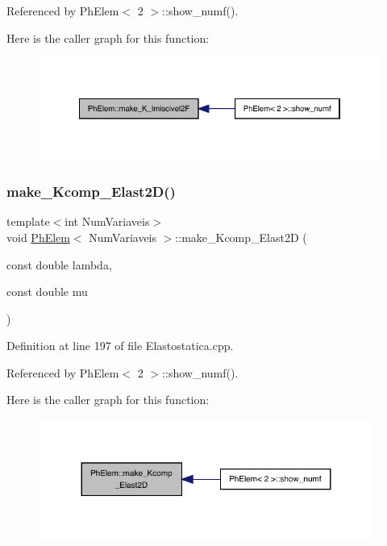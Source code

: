 Referenced by Ph\+Elem$<$ 2 $>$\+::show\+\_\+numf().

Here is the caller graph for this function\+:
\nopagebreak
\begin{figure}[H]
\begin{center}
\leavevmode
\includegraphics[width=334pt]{classPhElem_ae0418a5de14872e80fe4f9ffd9dd4fdd_icgraph}
\end{center}
\end{figure}
\mbox{\label{classPhElem_a1223b3e50580a1a7959e5f3b665d0761}} 
\subsubsection{\texorpdfstring{make\+\_\+\+Kcomp\+\_\+\+Elast2\+D()}{make\_Kcomp\_Elast2D()}}
{\footnotesize\ttfamily template$<$int Num\+Variaveis$>$ \\
void \hyperlink{classPhElem}{Ph\+Elem}$<$ Num\+Variaveis $>$\+::make\+\_\+\+Kcomp\+\_\+\+Elast2D (\begin{DoxyParamCaption}\item[{const double}]{lambda,  }\item[{const double}]{mu }\end{DoxyParamCaption})}



Definition at line 197 of file Elastostatica.\+cpp.



Referenced by Ph\+Elem$<$ 2 $>$\+::show\+\_\+numf().

Here is the caller graph for this function\+:
\nopagebreak
\begin{figure}[H]
\begin{center}
\leavevmode
\includegraphics[width=311pt]{classPhElem_a1223b3e50580a1a7959e5f3b665d0761_icgraph}
\end{center}
\end{figure}
\mbox{\label{classPhElem_a1ce74128a48a212028f644a68ce8edc0}} 
